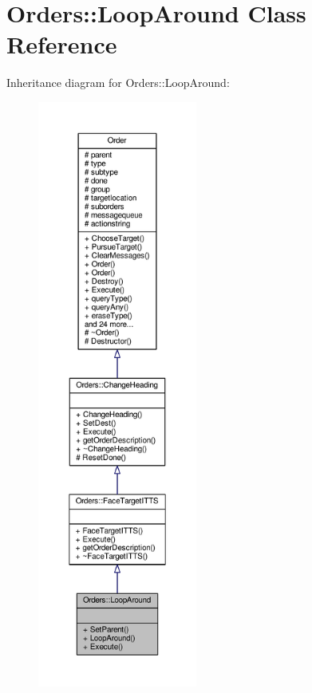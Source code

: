 \hypertarget{classOrders_1_1LoopAround}{}\section{Orders\+:\+:Loop\+Around Class Reference}
\label{classOrders_1_1LoopAround}


Inheritance diagram for Orders\+:\+:Loop\+Around\+:
\nopagebreak
\begin{figure}[H]
\begin{center}
\leavevmode
\includegraphics[height=550pt]{d8/dcb/classOrders_1_1LoopAround__inherit__graph}
\end{center}
\end{figure}


